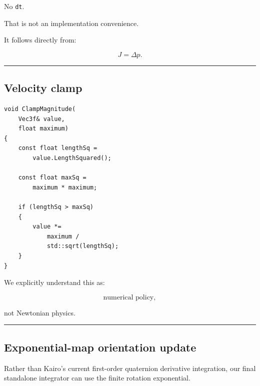 No \texttt{dt}.

That is not an implementation convenience.

It follows directly from:

\[
J=\Delta p.
\]

\begin{center}\rule{0.5\linewidth}{0.5pt}\end{center}

\subsection{Velocity clamp}\label{06-engine-ii-ch039-velocity-clamp}

\hypertarget{06-engine-ii-ch039-velocity-clamp}{}

\begin{verbatim}
void ClampMagnitude(
    Vec3f& value,
    float maximum)
{
    const float lengthSq =
        value.LengthSquared();

    const float maxSq =
        maximum * maximum;

    if (lengthSq > maxSq)
    {
        value *=
            maximum /
            std::sqrt(lengthSq);
    }
}
\end{verbatim}

We explicitly understand this as:

\[
\text{numerical policy},
\]

not Newtonian physics.

\begin{center}\rule{0.5\linewidth}{0.5pt}\end{center}

\subsection{Exponential-map orientation update}\label{06-engine-ii-ch039-exponential-map-orientation-update}

\hypertarget{06-engine-ii-ch039-exponential-map-orientation-update}{}

Rather than Kairo's current first-order quaternion derivative integration, our final standalone integrator can use the finite rotation exponential.

